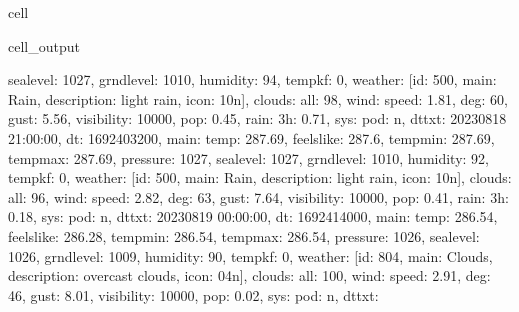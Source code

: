 \documentclass[letterpaper,10pt,english]{jupyterBook}
\begin{document}
\begin{sphinxuseclass}{cell}
\begin{sphinxVerbatimOutput}
\begin{sphinxuseclass}{cell_output}
\begin{sphinxVerbatim}[commandchars=\\\{\}]
\PYGZsq{}sea\PYGZus{}level\PYGZsq{}: 1027, \PYGZsq{}grnd\PYGZus{}level\PYGZsq{}: 1010, \PYGZsq{}humidity\PYGZsq{}: 94, \PYGZsq{}temp\PYGZus{}kf\PYGZsq{}: 0\PYGZcb{}, \PYGZsq{}weather\PYGZsq{}: [\PYGZob{}\PYGZsq{}id\PYGZsq{}: 500, \PYGZsq{}main\PYGZsq{}: \PYGZsq{}Rain\PYGZsq{}, \PYGZsq{}description\PYGZsq{}: \PYGZsq{}light rain\PYGZsq{}, \PYGZsq{}icon\PYGZsq{}: \PYGZsq{}10n\PYGZsq{}\PYGZcb{}], \PYGZsq{}clouds\PYGZsq{}: \PYGZob{}\PYGZsq{}all\PYGZsq{}: 98\PYGZcb{}, \PYGZsq{}wind\PYGZsq{}: \PYGZob{}\PYGZsq{}speed\PYGZsq{}: 1.81, \PYGZsq{}deg\PYGZsq{}: 60, \PYGZsq{}gust\PYGZsq{}: 5.56\PYGZcb{}, \PYGZsq{}visibility\PYGZsq{}: 10000, \PYGZsq{}pop\PYGZsq{}: 0.45, \PYGZsq{}rain\PYGZsq{}: \PYGZob{}\PYGZsq{}3h\PYGZsq{}: 0.71\PYGZcb{}, \PYGZsq{}sys\PYGZsq{}: \PYGZob{}\PYGZsq{}pod\PYGZsq{}: \PYGZsq{}n\PYGZsq{}\PYGZcb{}, \PYGZsq{}dt\PYGZus{}txt\PYGZsq{}: \PYGZsq{}2023\PYGZhy{}08\PYGZhy{}18 21:00:00\PYGZsq{}\PYGZcb{}, \PYGZob{}\PYGZsq{}dt\PYGZsq{}: 1692403200, \PYGZsq{}main\PYGZsq{}: \PYGZob{}\PYGZsq{}temp\PYGZsq{}: 287.69, \PYGZsq{}feels\PYGZus{}like\PYGZsq{}: 287.6, \PYGZsq{}temp\PYGZus{}min\PYGZsq{}: 287.69, \PYGZsq{}temp\PYGZus{}max\PYGZsq{}: 287.69, \PYGZsq{}pressure\PYGZsq{}: 1027, \PYGZsq{}sea\PYGZus{}level\PYGZsq{}: 1027, \PYGZsq{}grnd\PYGZus{}level\PYGZsq{}: 1010, \PYGZsq{}humidity\PYGZsq{}: 92, \PYGZsq{}temp\PYGZus{}kf\PYGZsq{}: 0\PYGZcb{}, \PYGZsq{}weather\PYGZsq{}: [\PYGZob{}\PYGZsq{}id\PYGZsq{}: 500, \PYGZsq{}main\PYGZsq{}: \PYGZsq{}Rain\PYGZsq{}, \PYGZsq{}description\PYGZsq{}: \PYGZsq{}light rain\PYGZsq{}, \PYGZsq{}icon\PYGZsq{}: \PYGZsq{}10n\PYGZsq{}\PYGZcb{}], \PYGZsq{}clouds\PYGZsq{}: \PYGZob{}\PYGZsq{}all\PYGZsq{}: 96\PYGZcb{}, \PYGZsq{}wind\PYGZsq{}: \PYGZob{}\PYGZsq{}speed\PYGZsq{}: 2.82, \PYGZsq{}deg\PYGZsq{}: 63, \PYGZsq{}gust\PYGZsq{}: 7.64\PYGZcb{}, \PYGZsq{}visibility\PYGZsq{}: 10000, \PYGZsq{}pop\PYGZsq{}: 0.41, \PYGZsq{}rain\PYGZsq{}: \PYGZob{}\PYGZsq{}3h\PYGZsq{}: 0.18\PYGZcb{}, \PYGZsq{}sys\PYGZsq{}: \PYGZob{}\PYGZsq{}pod\PYGZsq{}: \PYGZsq{}n\PYGZsq{}\PYGZcb{}, \PYGZsq{}dt\PYGZus{}txt\PYGZsq{}: \PYGZsq{}2023\PYGZhy{}08\PYGZhy{}19 00:00:00\PYGZsq{}\PYGZcb{}, \PYGZob{}\PYGZsq{}dt\PYGZsq{}: 1692414000, \PYGZsq{}main\PYGZsq{}: \PYGZob{}\PYGZsq{}temp\PYGZsq{}: 286.54, \PYGZsq{}feels\PYGZus{}like\PYGZsq{}: 286.28, \PYGZsq{}temp\PYGZus{}min\PYGZsq{}: 286.54, \PYGZsq{}temp\PYGZus{}max\PYGZsq{}: 286.54, \PYGZsq{}pressure\PYGZsq{}: 1026, \PYGZsq{}sea\PYGZus{}level\PYGZsq{}: 1026, \PYGZsq{}grnd\PYGZus{}level\PYGZsq{}: 1009, \PYGZsq{}humidity\PYGZsq{}: 90, \PYGZsq{}temp\PYGZus{}kf\PYGZsq{}: 0\PYGZcb{}, \PYGZsq{}weather\PYGZsq{}: [\PYGZob{}\PYGZsq{}id\PYGZsq{}: 804, \PYGZsq{}main\PYGZsq{}: \PYGZsq{}Clouds\PYGZsq{}, \PYGZsq{}description\PYGZsq{}: \PYGZsq{}overcast clouds\PYGZsq{}, \PYGZsq{}icon\PYGZsq{}: \PYGZsq{}04n\PYGZsq{}\PYGZcb{}], \PYGZsq{}clouds\PYGZsq{}: \PYGZob{}\PYGZsq{}all\PYGZsq{}: 100\PYGZcb{}, \PYGZsq{}wind\PYGZsq{}: \PYGZob{}\PYGZsq{}speed\PYGZsq{}: 2.91, \PYGZsq{}deg\PYGZsq{}: 46, \PYGZsq{}gust\PYGZsq{}: 8.01\PYGZcb{}, \PYGZsq{}visibility\PYGZsq{}: 10000, \PYGZsq{}pop\PYGZsq{}: 0.02, \PYGZsq{}sys\PYGZsq{}: \PYGZob{}\PYGZsq{}pod\PYGZsq{}: \PYGZsq{}n\PYGZsq{}\PYGZcb{}, \PYGZsq{}dt\PYGZus{}txt\PYGZsq{}: 
\end{sphinxVerbatim}
\end{sphinxuseclass}
\end{sphinxVerbatimOutput}
\end{sphinxuseclass}
\end{document}
